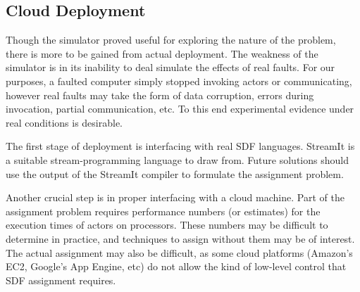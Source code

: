 \subsection{Cloud Deployment}

Though the simulator proved useful for exploring the nature of the problem, there is more to be gained from actual deployment.
The weakness of the simulator is in its inability to deal simulate the effects of real faults.
For our purposes, a faulted computer simply stopped invoking actors or communicating, however real faults may take the form of data corruption, errors during invocation, partial communication, etc.
To this end experimental evidence under real conditions is desirable.

The first stage of deployment is interfacing with real SDF languages.
StreamIt \cite{thies01, thies02, thies10, mal08} is a suitable stream-programming language to draw from.
Future solutions should use the output of the StreamIt compiler to formulate the assignment problem.

Another crucial step is in proper interfacing with a cloud machine.
Part of the assignment problem requires performance numbers (or estimates) for the execution times of actors on processors.
These numbers may be difficult to determine in practice, and techniques to assign without them may be of interest.
The actual assignment may also be difficult, as some cloud platforms (Amazon's EC2, Google's App Engine, etc) do not allow the kind of low-level control that SDF assignment requires.
